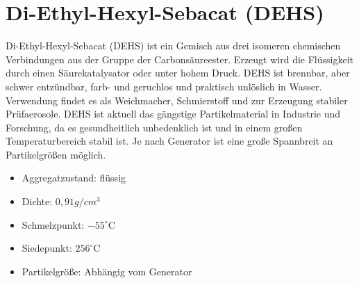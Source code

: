 \section{Di-Ethyl-Hexyl-Sebacat (DEHS)}
Di-Ethyl-Hexyl-Sebacat (DEHS) ist ein Gemisch aus drei isomeren chemischen Verbindungen aus der Gruppe der Carbons\"{a}ureester. Erzeugt wird die Fl\"{u}ssigkeit durch einen S\"{a}urekatalysator oder unter hohem Druck. DEHS ist brennbar, aber schwer entz\"{u}ndbar, farb- und geruchlos und praktisch unl\"{o}slich in Wasser. Verwendung findet es als Weichmacher, Schmierstoff und zur Erzeugung stabiler Pr\"{u}faerosole. DEHS ist aktuell das g\"{a}ngstige Partikelmaterial in Industrie und Forschung, da es gesundheitlich unbedenklich ist und in einem gro{\ss}en Temperaturbereich stabil ist. Je nach Generator ist eine gro{\ss}e Spannbreit an Partikelgr\"{o}{\ss}en m\"{o}glich.
\begin{itemize}
\item Aggregatzustand: fl\"{u}ssig
\item Dichte: \(0,91 g/cm^3\)
\item Schmelzpunkt: \(-55^\circ\text{C}\)
\item Siedepunkt: \(256^\circ\text{C}\)
\item Partikelgr\"{o}{\ss}e: Abh\"{a}ngig vom Generator
\end{itemize}